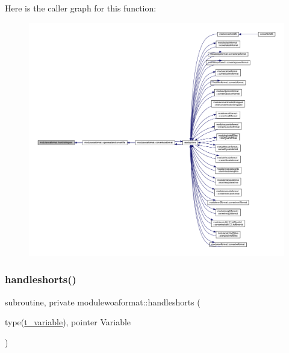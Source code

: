 Here is the caller graph for this function\+:\nopagebreak
\begin{figure}[H]
\begin{center}
\leavevmode
\includegraphics[width=350pt]{namespacemodulewoaformat_a4e5df04e6cd82c093f6173f3e08019aa_icgraph}
\end{center}
\end{figure}
\mbox{\label{namespacemodulewoaformat_a42841ad86b89b6a226e5430c17a32293}} 
\subsubsection{\texorpdfstring{handleshorts()}{handleshorts()}}
{\footnotesize\ttfamily subroutine, private modulewoaformat\+::handleshorts (\begin{DoxyParamCaption}\item[{type(\mbox{\hyperlink{structmodulewoaformat_1_1t__variable}{t\+\_\+variable}}), pointer}]{Variable }\end{DoxyParamCaption})\hspace{0.3cm}{\ttfamily [private]}}

